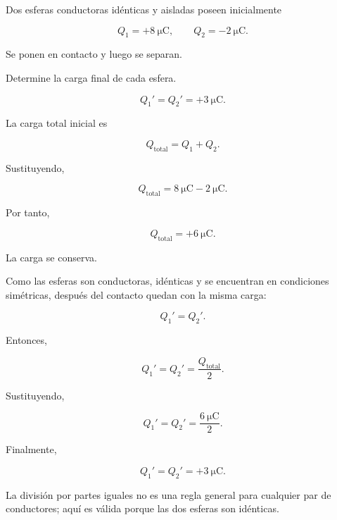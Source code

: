 \begin{ejercicio}

Dos esferas conductoras idénticas y aisladas poseen inicialmente

\[
Q_1=+\SI{8}{\micro\coulomb},
\qquad
Q_2=-\SI{2}{\micro\coulomb}.
\]

Se ponen en contacto y luego se separan.

Determine la carga final de cada esfera.

\end{ejercicio}

\begin{respuesta}

\[
\boxed{
Q_1'=Q_2'=+\SI{3}{\micro\coulomb}
}.
\]

\end{respuesta}

\begin{explicacion}

La carga total inicial es

\[
Q_{\text{total}}
=
Q_1+Q_2.
\]

Sustituyendo,

\[
Q_{\text{total}}
=
\SI{8}{\micro\coulomb}
-\SI{2}{\micro\coulomb}.
\]

Por tanto,

\[
Q_{\text{total}}
=
+\SI{6}{\micro\coulomb}.
\]

La carga se conserva.

Como las esferas son conductoras, idénticas y se encuentran en condiciones
simétricas, después del contacto quedan con la misma carga:

\[
Q_1'=Q_2'.
\]

Entonces,

\[
Q_1'=Q_2'
=
\frac{Q_{\text{total}}}{2}.
\]

Sustituyendo,

\[
Q_1'=Q_2'
=
\frac{\SI{6}{\micro\coulomb}}{2}.
\]

Finalmente,

\[
\boxed{
Q_1'=Q_2'=+\SI{3}{\micro\coulomb}
}.
\]

La división por partes iguales no es una regla general para cualquier par de
conductores; aquí es válida porque las dos esferas son idénticas.

\end{explicacion}



